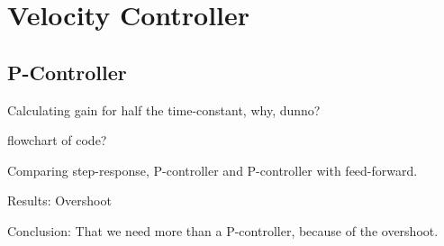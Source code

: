 \section{Velocity Controller}


\subsection{P-Controller}

Calculating gain for half the time-constant, why, dunno?



flowchart of code?

Comparing step-response, P-controller and P-controller with feed-forward.
 
Results:
Overshoot

Conclusion: 
That we need more than a P-controller, because of the overshoot. 
